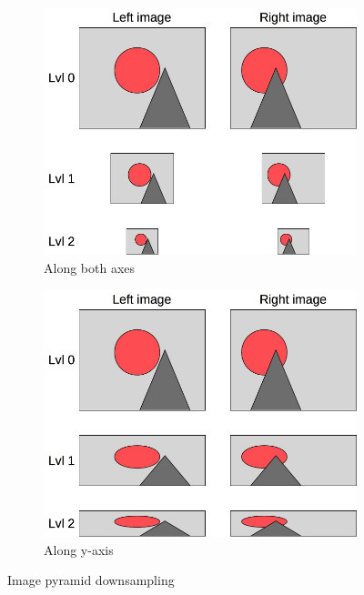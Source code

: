 \begin{figure}[ht]
  \centering
  \begin{subfigure}[t]{0.45\textwidth}
    \centering\includegraphics[width=\textwidth]{figures/imgdown1.jpg}
    \caption{Along both axes \label{fig:imgdown1}}
  \end{subfigure}\hspace{0.5cm}
  \begin{subfigure}[t]{0.45\textwidth}
    \centering\includegraphics[width=\textwidth]{figures/imgdown2}
    \caption{Along y-axis\label{fig:imgdown2}}
  \end{subfigure}
  \caption{Image pyramid downsampling \label{fig:imgdown}}
\end{figure}


